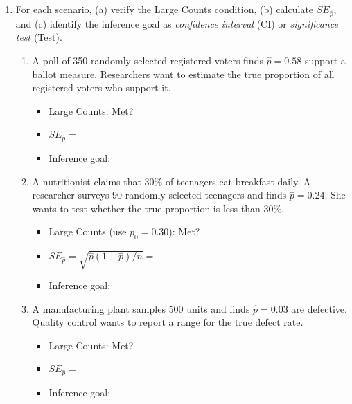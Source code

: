 \documentclass[10pt]{article}
\begin{document}
\namedateperiod

\vspace{0.15in}

\begin{enumerate}

  \item For each scenario, (a) verify the Large Counts condition, (b) calculate $SE_{\hat p}$,
        and (c) identify the inference goal as \emph{confidence interval} (CI) or
        \emph{significance test} (Test).

        \begin{enumerate}[label=\alph*.]
          \item[\textbf{I.}] A poll of 350 randomly selected registered voters finds $\hat p = 0.58$
                support a ballot measure. Researchers want to estimate the true proportion
                of all registered voters who support it.
                \begin{itemize}
                  \item Large Counts:  \quad Met? 
                  \item $SE_{\hat p} = $ 
                  \item Inference goal: 
                \end{itemize}

          \item[\textbf{II.}] A nutritionist claims that 30\% of teenagers eat breakfast daily.
                A researcher surveys 90 randomly selected teenagers and finds $\hat p = 0.24$.
                She wants to test whether the true proportion is less than 30\%.
                \begin{itemize}
                  \item Large Counts (use $p_0 = 0.30$):  \quad Met? 
                  \item $SE_{\hat p} = \sqrt{\hat p(1-\hat p)/n} = $ 
                  \item Inference goal: 
                \end{itemize}

          \item[\textbf{III.}] A manufacturing plant samples 500 units and finds $\hat p = 0.03$
                are defective. Quality control wants to report a range for the true defect rate.
                \begin{itemize}
                  \item Large Counts:  \quad Met? 
                  \item $SE_{\hat p} = $ 
                  \item Inference goal: 
                \end{itemize}
        \end{enumerate}


\end{enumerate}
\end{document}
